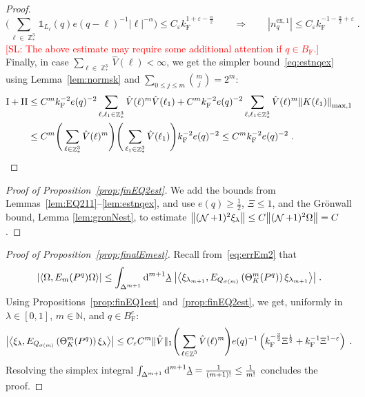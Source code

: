 \documentclass[12pt,a4paper]{article}
\numberwithin{equation}{section}
\newcommand{\1}{\mathbb{I}}
\newcommand{\di}{\textnormal{d}}
\newcommand{\ex}{\mathrm{ex}}
\newcommand{\F}{\mathrm{F}}
\newcommand{\I}{\mathrm{I}}
\newcommand{\II}{\mathrm{II}}
\DeclareMathOperator{\Z}{\mathbb{Z}}
\DeclareMathOperator{\NN}{\mathcal{N}}
\newcommand{\half}{\frac{1}{2}}
\newcommand{\eva}[1]{\left\langle #1 \right\rangle}
\theoremstyle{plain}
\theoremstyle{definition}
\theoremstyle{remark}
\theoremstyle{plain}
\theoremstyle{definition}
\theoremstyle{remark}
\begin{document}
\begin{proof}
\begin{equation}
	\Bigg( \sum_{\ell \in \Z^3_*} \mathds{1}_{L_\ell}(q) e(q-\ell)^{-1} |\ell|^{-\alpha} \Bigg)
	\le C_\varepsilon k_{\F}^{1 + \varepsilon - \frac{\alpha}{2}} \qquad \Rightarrow \qquad
	|n_q^{\ex,1}|
	\leq C_\varepsilon k_{\F}^{-1 - \frac{\alpha}{2} + \varepsilon} \;.
\end{equation}
\textcolor{red}{[SL: The above estimate may require some additional attention if $ q \in B_{\F} $.]}
Finally, in case $ \sum_{\ell \in \Z^3_*} \hat{V}(\ell) < \infty $, we get the simpler bound~\eqref{eq:estnqex} using Lemma~\ref{lem:normsk} and $ \sum_{0 \le j \le m} {{m}\choose j} = 2^m $:
\begin{equation}
\begin{aligned}
	\I + \II
	&\leq C^m k_{\F}^{-2} e(q)^{-2} \sum_{\ell,\ell_1 \in \Z^3_*}
		\hat{V}(\ell)^m
		\hat{V}(\ell_1)
	+ C^m k_{\F}^{-2} e(q)^{-2} \sum_{\ell,\ell_1 \in \Z^3_*}
		\hat{V}(\ell)^m
		\norm{K(\ell_1)}_{\max,1} \\
	&\leq C^m
		\Bigg( \sum\limits_{\ell \in \Z^3_*} \hat{V}(\ell)^m \Bigg)
		\Bigg( \sum\limits_{\ell_1 \in \Z^3_*} \hat{V}(\ell_1) \Bigg)
		k_{\F}^{-2} e(q)^{-2}
	\leq C^m k_{\F}^{-2} e(q)^{-2} \;.
\end{aligned}
\end{equation}
\end{proof}


\begin{proof}[Proof of Proposition~\ref{prop:finEQ2est}]
We add the bounds from Lemmas~\ref{lem:EQ211}--\ref{lem:estnqex}, and use $ e(q) \ge \half $, $ \Xi \le 1 $, and the Gr\"onwall bound, Lemma \ref{lem:gronNest}, to estimate $ \norm{(\NN+1)^2 \xi_\lambda} \le C \norm{(\NN+1)^2 \Omega} = C $.
\end{proof}



\begin{proof}[Proof of Proposition~\ref{prop:finalEmest}]
Recall from~\eqref{eq:errEm2} that
\begin{equation}
	\abs{\eva{\Omega, E_m(P^q) \Omega }}
	\le \int_{\Delta^{m+1}} \di^{m+1}\underline{\lambda} \;
		\abs{\eva{\xi_{\lambda_{m+1}}, E_{Q_{\sigma(m)}}\left(\Theta^{m}_{K}(P^q)\right) \xi_{\lambda_{m+1}}}} \;.
\end{equation}		
Using Propositions~\ref{prop:finEQ1est} and~\ref{prop:finEQ2est}, we get, uniformly in $ \lambda \in [0,1] $, $ m \in \mathbb{N} $, and $ q \in B_{\F}^c $:
\begin{equation}
	\abs{\eva{\xi_\lambda, E_{Q_{\sigma(m)}}\left(\Theta^{m}_{K}(P^q)\right) \xi_\lambda}}
	\le C_\varepsilon C^m \Vert \hat{V} \Vert_1
		\Bigg( \sum_{\ell \in \Z^3} \hat{V}(\ell)^m \Bigg)
		e(q)^{-1} \left( k_{\F}^{-\frac{3}{2}} \Xi^\half
		+ k_{\F}^{-1}\Xi^{1-\varepsilon} \right) \;.
\end{equation}
Resolving the simplex integral $ \int_{\Delta^{m+1}} \di^{m+1} \underline{\lambda} = \frac{1}{(m+1)!} \le \frac{1}{m!} $ concludes the proof.
\end{proof}
\end{document}
